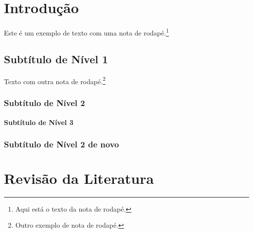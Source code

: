 \documentclass[12pt,a4paper,oneside,brazil]{abntex2}
\begin{document}

\listoffigures   %
\clearpage

\listoftables    %
\clearpage

\printglossary[type=abrev,title=Lista de Abreviaturas]
\clearpage

\printglossary[type=siglas,title=Lista de Siglas]
\clearpage

\printglossary[type=simbolos,title=Lista de Símbolos]
\clearpage

\tableofcontents
\clearpage



\setcounter{page}{1}
\textual

\justifying
\normalfont

\chapter{Introdução}
Este é um exemplo de texto com uma nota de rodapé.\footnote{Aqui está o texto da nota de rodapé.} \lipsum[1]

\section{Subtítulo de Nível 1}
Texto com outra nota de rodapé.\footnote{Outro exemplo de nota de rodapé.} \lipsum[2-3]

\subsection{Subtítulo de Nível 2}
\lipsum[4]
\subsubsection{Subtítulo de Nível 3}
\lipsum[5]
\lipsum[5]

\subsection{Subtítulo de Nível 2 de novo}

\chapter{Revisão da Literatura}
\lipsum[6-7]
\end{document}
